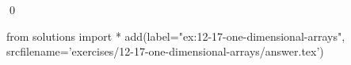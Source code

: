 
\begin{ex}
  \label{ex:12-17-one-dimensional-arrays}
  
  \qed
\end{ex}
\begin{python0}
from solutions import *
add(label="ex:12-17-one-dimensional-arrays",
    srcfilename='exercises/12-17-one-dimensional-arrays/answer.tex')
\end{python0}
